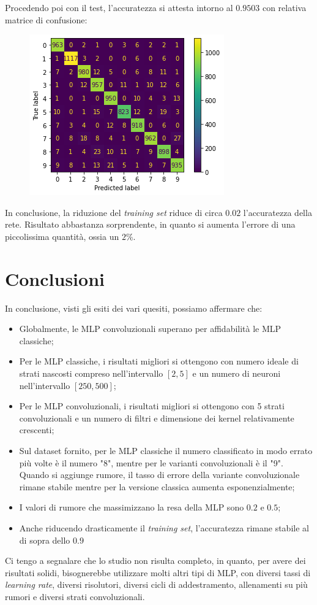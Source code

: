 \documentclass[12pt, a4paper]{article}
\begin{document}
Procedendo poi con il test, l'accuratezza si attesta intorno al \(0.9503\) con relativa matrice di confusione:
\begin{figure}[H]
    \centering
    \includegraphics[width=.5\textwidth]{Matrix10.png}
\end{figure}

In conclusione, la riduzione del \textit{training set} riduce di circa \(0.02\) l'accuratezza della rete. Risultato abbastanza sorprendente, in quanto si aumenta l'errore di una piccolissima quantità, ossia un \(2\%\).

\newpage
\section{Conclusioni}
In conclusione, visti gli esiti dei vari quesiti, possiamo affermare che:
\begin{itemize}
    \item Globalmente, le MLP convoluzionali superano per affidabilità le MLP classiche;
    \item Per le MLP classiche, i risultati migliori si ottengono con numero ideale di strati nascosti compreso nell'intervallo \([2, 5]\) e un numero di neuroni nell'intervallo \([250 , 500]\);
    \item Per le MLP convoluzionali, i risultati migliori si ottengono con 5 strati convoluzionali e un numero di filtri e dimensione dei kernel relativamente crescenti;
    \item Sul dataset fornito, per le MLP classiche il numero classificato in modo errato più volte è il numero "8", mentre per le varianti convoluzionali è il "9". Quando si aggiunge rumore, il tasso di errore della variante convoluzionale rimane stabile mentre per la versione classica aumenta esponenzialmente;
    \item I valori di rumore che massimizzano la resa della MLP sono \(0.2\) e \(0.5\);
    \item Anche riducendo drasticamente il \textit{training set}, l'accuratezza rimane stabile al di sopra dello \(0.9\)
\end{itemize}

Ci tengo a segnalare che lo studio non risulta completo, in quanto, per avere dei risultati solidi, bisognerebbe utilizzare molti altri tipi di MLP, con diversi tassi di \textit{learning rate}, diversi risolutori, diversi cicli di addestramento, allenamenti su più rumori e diversi strati convoluzionali.
\end{document}
